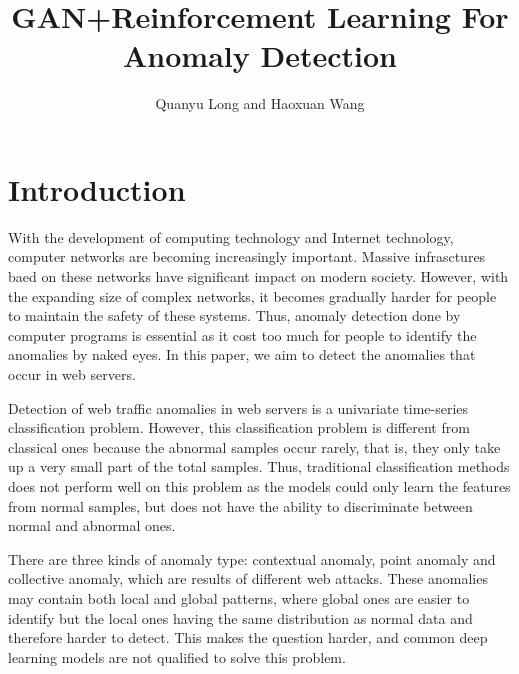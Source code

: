 \documentclass{acmtog} %
\begin{document}

\title{GAN+Reinforcement Learning For Anomaly Detection} %

\author{Quanyu Long {\upshape and} Haoxuan Wang
}


\maketitle

\section{Introduction}
With the development of computing technology and Internet technology, computer networks are becoming increasingly important. Massive infrasctures baed on these networks have significant impact on modern society. However, with the expanding size of complex networks, it becomes gradually harder for people to maintain the safety of these systems. Thus, anomaly detection done by computer programs is essential as it cost too much for people to identify the anomalies by naked eyes. In this paper, we aim to detect the anomalies that occur in web servers. 

Detection of web traffic anomalies in web servers is a univariate time-series classification problem. However, this classification problem is different from classical ones because the abnormal samples occur rarely, that is, they only take up a very small part of the total samples. Thus, traditional classification methods does not perform well on this problem as the models could only learn the features from normal samples, but does not have the ability to discriminate between normal and abnormal ones. 

There are three kinds of anomaly type: contextual anomaly, point anomaly and collective anomaly, which are results of different web attacks. These anomalies may contain both local and global patterns, where global ones are easier to identify but the local ones having the same distribution as normal data and therefore harder to detect. This makes the question harder, and common deep learning models are not qualified to solve this problem.  
\end{document}
